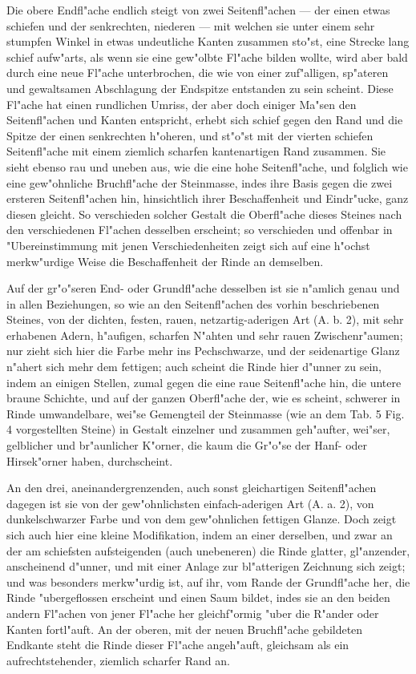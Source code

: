 \documentclass[a4paper, 11pt, oneside, german]{article}
\begin{document}
Die obere Endfl"ache endlich steigt von zwei Seitenfl"achen --- der einen etwas schiefen und der senkrechten, niederen --- mit welchen sie unter einem sehr stumpfen Winkel in etwas undeutliche Kanten zusammen sto"st, eine Strecke lang schief aufw"arts, als wenn sie eine gew"olbte Fl"ache bilden wollte, wird aber bald durch eine neue Fl"ache unterbrochen, die wie von einer zuf"alligen, sp"ateren und gewaltsamen Abschlagung der Endspitze entstanden zu sein scheint. Diese Fl"ache hat einen rundlichen Umriss, der aber doch einiger Ma"sen den Seitenfl"achen und Kanten entspricht, erhebt sich schief gegen den Rand und die Spitze der einen senkrechten h"oheren, und st"o"st mit der vierten schiefen Seitenfl"ache mit einem ziemlich scharfen kantenartigen Rand zusammen. Sie sieht ebenso rau und uneben aus, wie die eine hohe Seitenfl"ache, und folglich wie eine gew"ohnliche Bruchfl"ache der Steinmasse, indes ihre Basis gegen die zwei ersteren Seitenfl"achen hin, hinsichtlich ihrer Beschaffenheit und Eindr"ucke, ganz diesen gleicht. So verschieden solcher Gestalt die Oberfl"ache dieses Steines nach den verschiedenen Fl"achen desselben erscheint; so verschieden und offenbar in "Ubereinstimmung mit jenen Verschiedenheiten zeigt sich auf eine h"ochst merkw"urdige Weise die Beschaffenheit der Rinde an demselben.

Auf der gr"o"seren End- oder Grundfl"ache desselben ist sie n"amlich genau und in allen Beziehungen, so wie an den Seitenfl"achen des vorhin beschriebenen Steines, von der dichten, festen, rauen, netzartig-aderigen Art (A. b. 2), mit sehr erhabenen Adern, h"aufigen, scharfen N"ahten und sehr rauen Zwischenr"aumen; nur zieht sich hier die Farbe mehr ins Pechschwarze, und der seidenartige Glanz n"ahert sich mehr dem fettigen; auch scheint die Rinde hier d"unner zu sein, indem an einigen Stellen, zumal gegen die eine raue Seitenfl"ache hin, die untere braune Schichte, und auf der ganzen Oberfl"ache der, wie es scheint, schwerer in Rinde umwandelbare, wei"se Gemengteil der Steinmasse (wie an dem Tab. 5 Fig. 4 vorgestellten Steine) in Gestalt einzelner und zusammen geh"aufter, wei"ser, gelblicher und br"aunlicher K"orner, die kaum die Gr"o"se der Hanf- oder Hirsek"orner haben, durchscheint.

An den drei, aneinandergrenzenden, auch sonst gleichartigen Seitenfl"achen dagegen ist sie von der gew"ohnlichsten einfach-aderigen Art (A. a. 2), von dunkelschwarzer Farbe und von dem gew"ohnlichen fettigen Glanze. Doch zeigt sich auch hier eine kleine Modifikation, indem an einer derselben, und zwar an der am schiefsten aufsteigenden (auch unebeneren) die Rinde glatter, gl"anzender, anscheinend d"unner, und mit einer Anlage zur bl"atterigen Zeichnung sich zeigt; und was besonders merkw"urdig ist, auf ihr, vom Rande der Grundfl"ache her, die Rinde "ubergeflossen erscheint und einen Saum bildet, indes sie an den beiden andern Fl"achen von jener Fl"ache her gleichf"ormig "uber die R"ander oder Kanten fortl"auft. An der oberen, mit der neuen Bruchfl"ache gebildeten Endkante steht die Rinde dieser Fl"ache angeh"auft, gleichsam als ein aufrechtstehender, ziemlich scharfer Rand an.
\end{document}
